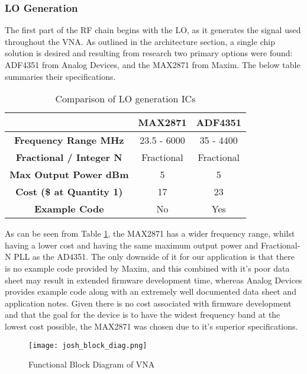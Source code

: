 \subsubsection{LO Generation}
The first part of the RF chain begins with the LO, as it generates the signal used throughout the VNA. As outlined in the architecture section, a single chip solution is desired and resulting from research two primary options were found: ADF4351 from Analog Devices, and the MAX2871 from Maxim. The below table summaries their specifications. 

\begin{table}[H]
	\caption{Comparison of LO generation ICs}
	\label{table:lo_comparison}
	\centering
\begin{tabular}{|c|c|c|}
	\hline
	\multicolumn{1}{|l|}{}          & \textbf{MAX2871} & \textbf{ADF4351} \\ \hline
	\textbf{Frequency Range MHz}    & 23.5 - 6000      & 35 - 4400        \\ \hline
	\textbf{Fractional / Integer N} & Fractional       & Fractional       \\ \hline
	\textbf{Max Output Power dBm}   & 5                & 5                \\ \hline
	\textbf{Cost (\$ at Quantity 1)}& 17               & 23             \\ \hline
	\textbf{Example Code}           & No               & Yes              \\ \hline
\end{tabular}
\end{table}

As can be seen from Table \ref{table:lo_comparison}, the MAX2871 has a wider frequency range, whilst having a lower cost and having the same maximum output power and Fractional-N PLL as the AD4351. The only downside of it for our application is that there is no example code provided by Maxim, and this combined with it's poor data sheet may result in extended firmware development time, whereas Analog Devices provides example code along with an extremely well documented data sheet and application notes. Given there is no cost associated with firmware development and that the goal for the device is to have the widest frequency band at the lowest cost possible, the MAX2871 was chosen due to it's superior specifications. 

\begin{landscape}
	\begin{figure}
		\centering
		\texttt{[image: josh\_block\_diag.png]}
		\caption{Functional Block Diagram of VNA}
		\label{fig:vna_block_diag}
	\end{figure}
\end{landscape}

